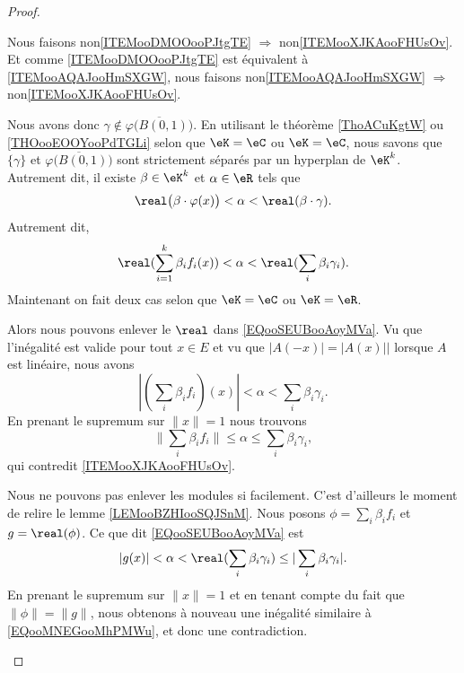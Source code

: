 \begin{proof}
\begin{subproof}
		\spitem[\ref{ITEMooXJKAooFHUsOv} \( \Rightarrow\) \ref{ITEMooDMOOooPJtgTE}]
		Nous faisons non\ref{ITEMooDMOOooPJtgTE} \( \Rightarrow\) non\ref{ITEMooXJKAooFHUsOv}. Et comme \ref{ITEMooDMOOooPJtgTE} est équivalent à \ref{ITEMooAQAJooHmSXGW}, nous faisons non\ref{ITEMooAQAJooHmSXGW} \( \Rightarrow\) non\ref{ITEMooXJKAooFHUsOv}.

		Nous avons donc \( \gamma\not\in\overline{\varphi\big( B(0,1) \big)}\). En utilisant le théorème \ref{ThoACuKgtW} ou \ref{THOooEOOYooPdTGLi} selon que \( \eK=\eC\) ou \( \eK=\eC\), nous savons que \( \{ \gamma \}\) et \( \overline{\varphi\big( B(0,1) \big)}\) sont strictement séparés par un hyperplan de \( \eK^k\). Autrement dit, il existe \( \beta\in \eK^k\) et \( \alpha\in \eR\) tels que
		\begin{equation}
			\real\big( \beta\cdot \varphi(x) \big)<\alpha<\real(\beta\cdot\gamma).
		\end{equation}
		Autrement dit,
		\begin{equation}		\label{EQooSEUBooAoyMVa}
			\real(\sum_{i=1}^k\beta_if_i(x))<\alpha<\real(\sum_i\beta_i\gamma_i).
		\end{equation}
		Maintenant on fait deux cas selon que \( \eK=\eC\) ou \( \eK=\eR\).
		\begin{subproof}
			\spitem[Si \( \eK=\eR\)]
			Alors nous pouvons enlever le \( \real\) dans \eqref{EQooSEUBooAoyMVa}. Vu que l'inégalité est valide pour tout \( x\in E\) et vu que \( | A(-x)|=| A(x) | |\) lorsque \( A\) est linéaire, nous avons
			\begin{equation}
				| (\sum_i\beta_if_i)(x) |<\alpha<\sum_i\beta_i\gamma_i.
			\end{equation}
			En prenant le supremum sur \( \| x \|=1\) nous trouvons
			\begin{equation}		\label{EQooMNEGooMhPMWu}
				\| \sum_i\beta_if_i \|\leq\alpha\leq \sum_i\beta_i\gamma_i,
			\end{equation}
			qui contredit \ref{ITEMooXJKAooFHUsOv}.

			\spitem[Si \( \eK=\eC\)]
			Nous ne pouvons pas enlever les modules si facilement. C'est d'ailleurs le moment de relire le lemme \ref{LEMooBZHIooSQJSnM}. Nous posons \( \phi=\sum_i\beta_if_i\) et \( g=\real(\phi)\). Ce que dit \eqref{EQooSEUBooAoyMVa} est
			\begin{equation}
				| g(x) |<\alpha<\real(\sum_i\beta_i\gamma_i)\leq | \sum_i\beta_i\gamma_i |.
			\end{equation}
			En prenant le supremum sur \( \| x \|=1\) et en tenant compte du fait que \( \| \phi \|=\| g \|\), nous obtenons à nouveau une inégalité similaire à \eqref{EQooMNEGooMhPMWu}, et donc une contradiction.
		\end{subproof}
	\end{subproof}
\end{proof}

